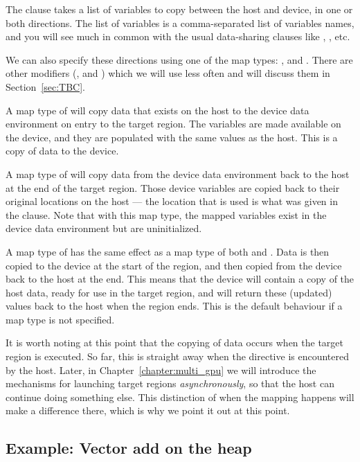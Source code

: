 The  clause takes a list of variables to copy between the host and device, in one or both directions.
The list of variables is a comma-separated list of variables names, and you will see much in common with the usual data-sharing clauses like , , etc.

We can also specify these directions using one of the map types: ,  and .
There are other modifiers (,  and ) which we will use less often and will discuss them in Section~\ref{sec:TBC}.

A map type of  will copy data that exists on the host to the device data environment on entry to the target region.
The variables are made available on the device, and they are populated with the same values as the host.
This is a copy of data to the device.

A map type of  will copy data from the device data environment back to the host at the end of the target region.
Those device variables are copied back to their original locations on the host --- the location that is used is what was given in the  clause.
Note that with this map type, the mapped variables exist in the device data environment but are uninitialized.

A map type of  has the same effect as a map type of both  and .
Data is then copied to the device at the start of the region, and then copied from the device back to the host at the end.
This means that the device will contain a copy of the host data, ready for use in the target region, and will return these (updated) values back to the host when the region ends.
This is the default behaviour if a map type is not specified.

It is worth noting at this point that the copying of data occurs when the target region is executed.
So far, this is straight away when the  directive is encountered by the host.
Later, in Chapter~\ref{chapter:multi_gpu} we will introduce the mechanisms for launching target regions \emph{asynchronously}, so that the host can continue doing something else.
This distinction of when the mapping happens will make a difference there, which is why we point it out at this point.

\subsection{Example: Vector add on the heap}

